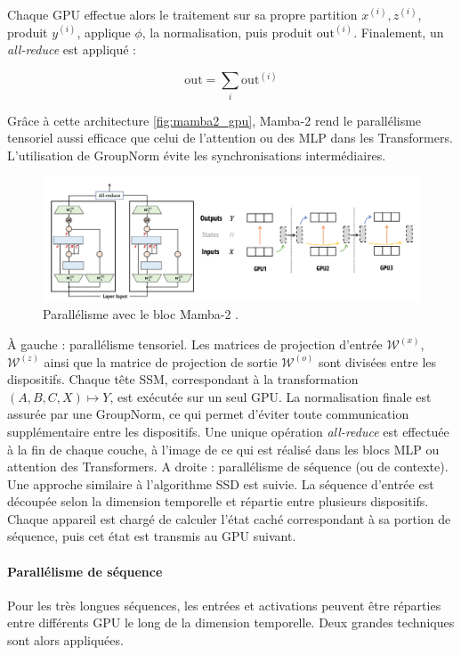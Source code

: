 Chaque GPU effectue alors le traitement sur sa propre partition $x^{(i)}, z^{(i)}$, produit $y^{(i)}$, applique $\phi$, la normalisation, puis produit $\text{out}^{(i)}$. Finalement, un \textit{all-reduce} est appliqué :

\[
\text{out} = \sum_i \text{out}^{(i)}
\]

Grâce à cette architecture \autoref{fig:mamba2_gpu}, Mamba-2 rend le parallélisme tensoriel aussi efficace que celui de l’attention ou des MLP dans les Transformers. L’utilisation de GroupNorm évite les synchronisations intermédiaires.

\begin{figure}[H]
    \centering
\includegraphics[width=1.0\linewidth]{images/mamba2_gpu.png}
    \caption{Parallélisme avec le bloc Mamba-2 \citep{dao2024mamba2}.}
    \label{fig:mamba2_gpu}
\end{figure}

À gauche : parallélisme tensoriel. Les matrices de projection d’entrée $\mathcal{W}^{(x)}$, $\mathcal{W}^{(z)}$ ainsi que la matrice de projection de sortie $\mathcal{W}^{(o)}$ sont divisées entre les dispositifs. Chaque tête SSM, correspondant à la transformation $(A, B, C, X) \mapsto Y$, est exécutée sur un seul GPU. La normalisation finale est assurée par une GroupNorm, ce qui permet d’éviter toute communication supplémentaire entre les dispositifs. Une unique opération \textit{all-reduce} est effectuée à la fin de chaque couche, à l’image de ce qui est réalisé dans les blocs MLP ou attention des Transformers. A droite : parallélisme de séquence (ou de contexte). Une approche similaire à l’algorithme SSD est suivie. La séquence d’entrée est découpée selon la dimension temporelle et répartie entre plusieurs dispositifs. Chaque appareil est chargé de calculer l’état caché correspondant à sa portion de séquence, puis cet état est transmis au GPU suivant.

\paragraph{Parallélisme de séquence} Pour les très longues séquences, les entrées et activations peuvent être réparties entre différents GPU le long de la dimension temporelle. Deux grandes techniques sont alors appliquées.\\


